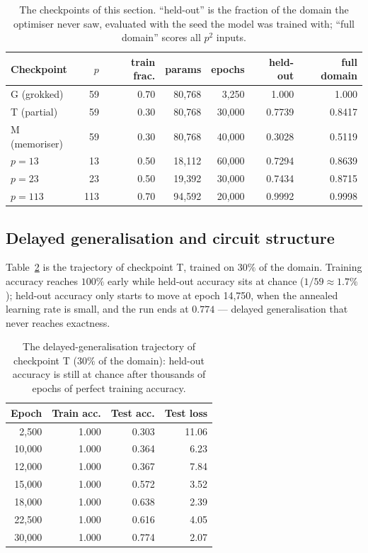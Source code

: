 \documentclass[11pt]{article}
\begin{document}
\begin{table}[t]
\centering
\small
\begin{tabular}{@{}lrrrrrr@{}}
\toprule
Checkpoint & $p$ & train frac. & params & epochs & held-out & full domain \\
\midrule
G (grokked) & 59 & 0.70 & 80{,}768 & 3{,}250 & 1.000 & 1.000 \\
T (partial) & 59 & 0.30 & 80{,}768 & 30{,}000 & 0.7739 & 0.8417 \\
M (memoriser) & 59 & 0.30 & 80{,}768 & 40{,}000 & 0.3028 & 0.5119 \\
$p=13$ & 13 & 0.50 & 18{,}112 & 60{,}000 & 0.7294 & 0.8639 \\
$p=23$ & 23 & 0.50 & 19{,}392 & 30{,}000 & 0.7434 & 0.8715 \\
$p=113$ & 113 & 0.70 & 94{,}592 & 20{,}000 & 0.9992 & 0.9998 \\
\bottomrule
\end{tabular}
\caption{The checkpoints of this section. ``held-out'' is the fraction of the domain the optimiser never saw, evaluated with the seed the model was trained with; ``full domain'' scores all $p^2$ inputs.}\label{tab:checkpoints}
\end{table}

\subsection{Delayed generalisation and circuit structure}

Table~\ref{tab:training} is the trajectory of checkpoint T, trained on $30\%$ of the domain. Training accuracy reaches $100\%$ early while held-out accuracy sits at chance ($1/59\approx1.7\%$); held-out accuracy only starts to move at epoch 14,750, when the annealed learning rate is small, and the run ends at $0.774$ --- delayed generalisation that never reaches exactness.

\begin{table}[t]
\centering
\small
\begin{tabular}{@{}rrrr@{}}
\toprule
Epoch & Train acc. & Test acc. & Test loss \\
\midrule
2{,}500 & 1.000 & 0.303 & 11.06 \\
10{,}000 & 1.000 & 0.364 & 6.23 \\
12{,}000 & 1.000 & 0.367 & 7.84 \\
15{,}000 & 1.000 & 0.572 & 3.52 \\
18{,}000 & 1.000 & 0.638 & 2.39 \\
22{,}500 & 1.000 & 0.616 & 4.05 \\
30{,}000 & 1.000 & 0.774 & 2.07 \\
\bottomrule
\end{tabular}
\caption{The delayed-generalisation trajectory of checkpoint T ($30\%$ of the domain): held-out accuracy is still at chance after thousands of epochs of perfect training accuracy.}\label{tab:training}
\end{table}
\end{document}
